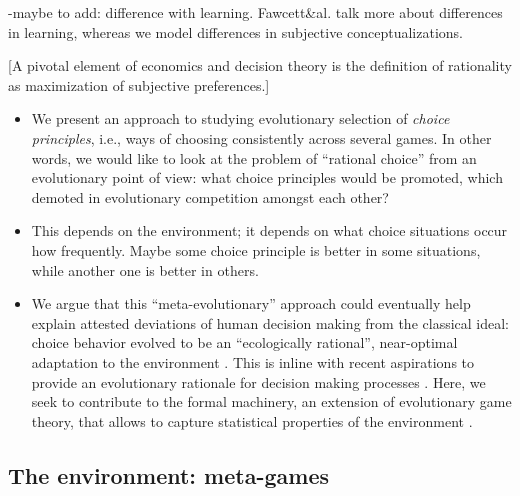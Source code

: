 \documentclass[fleqn,reqno,11pt]{article}
\begin{document}
-maybe to add: difference with learning. Fawcett\&al. talk more about differences in learning, whereas we model differences in subjective conceptualizations.


[A pivotal element of economics and decision theory is the definition of rationality as
maximization of subjective preferences.]



\begin{itemize}
\item We present an approach to studying evolutionary selection of \emph{choice principles},
  i.e., ways of choosing consistently across several games. In other words, we would like to
  look at the problem of ``rational choice'' from an evolutionary point of view: what choice
  principles would be promoted, which demoted in evolutionary competition amongst each other?

\item This depends on the environment; it depends on what choice situations occur how
  frequently. Maybe some choice principle is better in some situations, while another one is
  better in others. 


\item We argue that this ``meta-evolutionary'' approach could eventually help explain attested
  deviations of human decision making from the classical ideal: choice behavior evolved to be
  an ``ecologically rational'', near-optimal adaptation to the environment
  \citep{Anderson1990:The-Adaptive-Ch,Anderson1991:Is-human-cognit,GigerenzerGoldstein1996:Reasoning-the-F,ChaterOaksford2000:The-Rational-An}. This
  is inline with recent aspirations to provide an evolutionary rationale for decision making
  processes
  \citep[e.g.,][]{HammersteinStevens2012:Six-Reasons-for,FawcettHamblin2013:Exposing-the-be}. Here,
  we seek to contribute to the formal machinery, an extension of evolutionary game theory, that
  allows to capture statistical properties of the environment
  \citep[cf.][]{McNamara2013:Towards-a-Riche}.
\end{itemize}



\subsection{The environment: meta-games}
\end{document}
